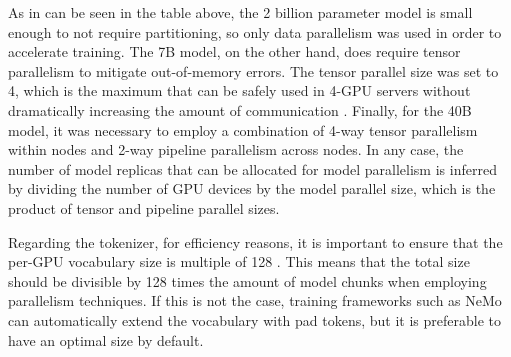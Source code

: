 

As in can be seen in the table above, the 2 billion parameter model is small enough to not require partitioning, so only data parallelism was used in order to accelerate training. The 7B model, on the other hand, does require tensor parallelism \cite{megatron-lm} to mitigate out-of-memory errors. The tensor parallel size was set to 4, which is the maximum that can be safely used in 4-GPU servers without dramatically increasing the amount of communication \cite{interleaving}. Finally, for the 40B model, it was necessary to employ a combination of 4-way tensor parallelism within nodes and 2-way pipeline parallelism across nodes. In any case, the number of model replicas that can be allocated for model parallelism is inferred by dividing the number of GPU devices by the model parallel size, which is the product of tensor and pipeline parallel sizes. 

Regarding the tokenizer, for efficiency reasons, it is important to ensure that the per-GPU vocabulary size is multiple of 128 \cite{megatron-lm}. This means that the total size should be divisible by 128 times the amount of model chunks when employing parallelism techniques. If this is not the case, training frameworks such as NeMo can automatically extend the vocabulary with pad tokens, but it is preferable to have an optimal size by default.


